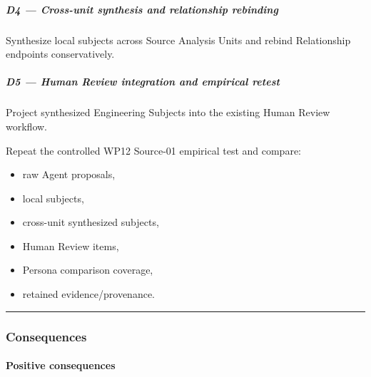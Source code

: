 \hypertarget{d4--cross-unit-synthesis-and-relationship-rebinding}{%
\subparagraph{D4 --- Cross-unit synthesis and relationship rebinding}\label{d4--cross-unit-synthesis-and-relationship-rebinding}}

Synthesize local subjects across Source Analysis Units and rebind Relationship endpoints conservatively.

\hypertarget{d5--human-review-integration-and-empirical-retest}{%
\subparagraph{D5 --- Human Review integration and empirical retest}\label{d5--human-review-integration-and-empirical-retest}}

Project synthesized Engineering Subjects into the existing Human Review workflow.

Repeat the controlled WP12 Source-01 empirical test and compare:

\begin{itemize}
\tightlist
\item
  raw Agent proposals,
\item
  local subjects,
\item
  cross-unit synthesized subjects,
\item
  Human Review items,
\item
  Persona comparison coverage,
\item
  retained evidence/provenance.
\end{itemize}

\begin{center}\rule{0.5\linewidth}{0.5pt}\end{center}

\hypertarget{consequences-11}{%
\subsubsection{Consequences}\label{consequences-11}}

\hypertarget{positive-consequences-6}{%
\paragraph{Positive consequences}\label{positive-consequences-6}}

